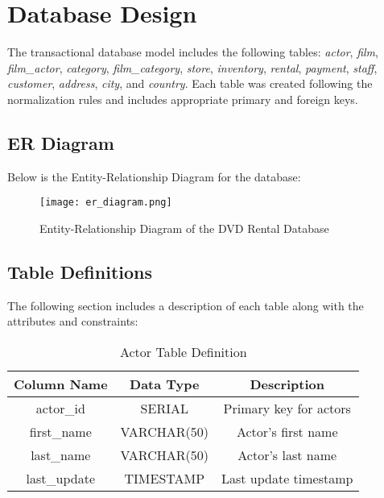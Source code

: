 \documentclass[a4paper, 12pt]{article}
\begin{document}
\section{Database Design}
The transactional database model includes the following tables: \emph{actor}, \emph{film}, \emph{film\_actor}, \emph{category}, \emph{film\_category}, \emph{store}, \emph{inventory}, \emph{rental}, \emph{payment}, \emph{staff}, \emph{customer}, \emph{address}, \emph{city}, and \emph{country}. Each table was created following the normalization rules and includes appropriate primary and foreign keys.

\subsection{ER Diagram}
Below is the Entity-Relationship Diagram for the database:

\begin{figure}[h!]
    \centering
    \texttt{[image: er\_diagram.png]}
    \caption{Entity-Relationship Diagram of the DVD Rental Database}
\end{figure}

\subsection{Table Definitions}
The following section includes a description of each table along with the attributes and constraints:

\begin{table}[h!]
    \centering
    \begin{tabular}{|c|c|c|}
        \hline
        \textbf{Column Name} & \textbf{Data Type} & \textbf{Description} \\
        \hline
        actor\_id & SERIAL & Primary key for actors \\
        first\_name & VARCHAR(50) & Actor's first name \\
        last\_name & VARCHAR(50) & Actor's last name \\
        last\_update & TIMESTAMP & Last update timestamp \\
        \hline
    \end{tabular}
    \caption{Actor Table Definition}
\end{table}

\end{document}
